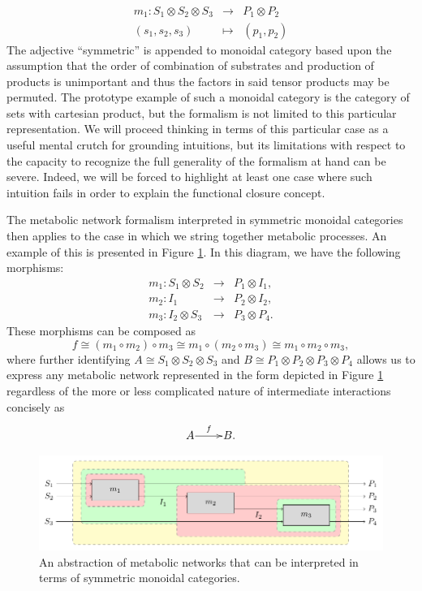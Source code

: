 \documentclass[10pt]{article}
\begin{document}
\begin{eqnarray*}
m_1 \colon S_1 \otimes S_2 \otimes S_3 &\longrightarrow& P_1 \otimes P_2\\
(s_1,s_2,s_3) &\longmapsto& (p_1,p_2)
\end{eqnarray*}
The adjective ``symmetric'' is appended to monoidal category based upon the assumption that the order of combination of substrates and production of products is unimportant and thus the factors in said tensor products may be permuted. The prototype example of such a monoidal category is the category of sets with cartesian product, but the formalism is not limited to this particular representation. We will proceed thinking in terms of this particular case as a useful mental crutch for grounding intuitions, but its limitations with respect to the capacity to recognize the full generality of the formalism at hand can be severe. Indeed, we will be forced to highlight at least one case where such intuition fails in order to explain the functional closure concept.

The metabolic network formalism interpreted in symmetric monoidal categories then applies to the case in which we string together metabolic processes. An example of this is presented in Figure \ref{fig:metabolicstringdiag}. In this diagram, we have the following morphisms:
\begin{eqnarray*}
m_1 \colon S_1 \otimes S_2 &\longrightarrow& P_1 \otimes I_1,\\
m_2 \colon I_1 &\longrightarrow& P_2 \otimes I_2,\\
m_3 \colon I_2 \otimes S_3 &\longrightarrow& P_3 \otimes P_4.
\end{eqnarray*}
These morphisms can be composed as 
$$
f \cong (m_1 \circ m_2) \circ m_3 \cong m_1 \circ (m_2 \circ m_3) \cong m_1 \circ m_2 \circ m_3,
$$
where further identifying $A \cong S_1 \otimes S_2 \otimes S_3$ and $B \cong P_1 \otimes P_2 \otimes P_3 \otimes P_4$ allows us to express any metabolic network represented in the form depicted in Figure \ref{fig:metabolicstringdiag} regardless of the more or less complicated nature of intermediate interactions concisely as
$$
\xymatrix@1{
	A\ar[r]^-{f} & B.
	}
$$
\begin{figure}
\begin{center}
\noindent\includegraphics[width=0.9\columnwidth]{fig/blockdiagtop.pdf}
\end{center}
\caption{An abstraction of metabolic networks that can be interpreted in terms of symmetric monoidal categories.}
\label{fig:metabolicstringdiag}
\end{figure}
\end{document}
